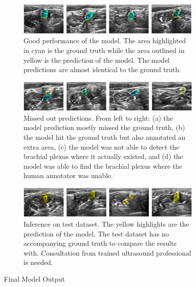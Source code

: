 \documentclass{article}
\begin{document}
\begin{figure}[ht]
    \centering
    \begin{subfigure}[b]{1.0\linewidth}
        \includegraphics[width=1.0\linewidth]{figures/result_1.png}
        \caption{Good performance of the model. The area highlighted in cyan is the ground truth while the area outlined in yellow is the prediction of the model. The model predictions are almost identical to the ground truth.}
        \label{fig:result_1}
    \end{subfigure}
    
    \begin{subfigure}[b]{1.0\linewidth}
        \includegraphics[width=1.0\linewidth]{figures/result_2.png}
        \caption{Missed out predictions. From left to right: (a) the model prediction mostly missed the ground truth, (b) the model hit the ground truth but also annotated an extra area, (c) the model was not able to detect the brachial plexus where it actually existed, and (d) the model was able to find the brachial plexus where the human annotator was unable.}
        \label{fig:result_2}
    \end{subfigure}
    
    \begin{subfigure}[b]{1.0\linewidth}
        \includegraphics[width=1.0\linewidth]{figures/result_3.png}
        \caption{Inference on test dataset. The yellow highlights are the prediction of the model. The test dataset has no accompanying ground truth to compare the results with. Consultation from trained ultrasound professional is needed.}
        \label{fig:result_3}
    \end{subfigure}


    \caption{Final Model Output}
    \label{fig:result}
\end{figure}


\bigskip


\bigskip


\bigskip


\bigskip




\end{document}
